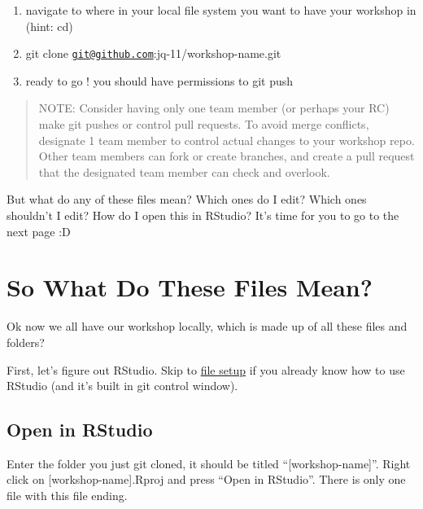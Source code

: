 \documentclass[
]{book}
\theoremstyle{definition}
\theoremstyle{definition}
\theoremstyle{definition}
\theoremstyle{definition}
\theoremstyle{remark}
\begin{document}
\begin{enumerate}
\def\labelenumi{\arabic{enumi}.}
\item
  navigate to where in your local file system you want to have your workshop in (hint: cd)
\item
  git clone \href{mailto:git@github.com}{\nolinkurl{git@github.com}}:jq-11/workshop-name.git
\item
  ready to go ! you should have permissions to git push
\end{enumerate}

\begin{quote}
NOTE: Consider having only one team member (or perhaps your RC) make git pushes or control pull requests. To avoid merge conflicts, designate 1 team member to control actual changes to your workshop repo. Other team members can fork or create branches, and create a pull request that the designated team member can check and overlook.
\end{quote}

But what do any of these files mean? Which ones do I edit? Which ones shouldn't I edit? How do I open this in RStudio? It's time for you to go to the next page :D

\chapter{So What Do These Files Mean?}\label{so-what-do-these-files-mean}

Ok now we all have our workshop locally, which is made up of all these files and folders?

First, let's figure out RStudio. Skip to \hyperref[file-setup]{file setup} if you already know how to use RStudio (and it's built in git control window).

\section{Open in RStudio}\label{open-in-rstudio}

Enter the folder you just git cloned, it should be titled ``{[}workshop-name{]}''. Right click on {[}workshop-name{]}.Rproj and press ``Open in RStudio''. There is only one file with this file ending.
\end{document}
